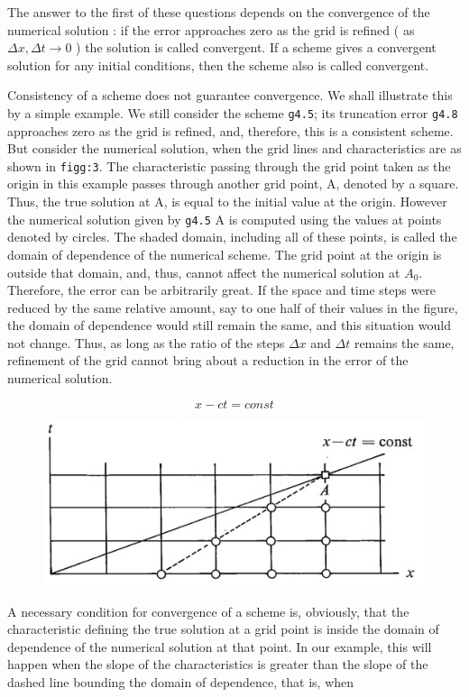 The answer to the first of these questions depends on the convergence of
the numerical solution : if the error approaches zero as the grid is
refined ( as \(\Delta x, \Delta t \rightarrow 0\) ) the solution is
called convergent. If a scheme gives a convergent solution for any
initial conditions, then the scheme also is called convergent.

Consistency of a scheme does not guarantee convergence. We shall
illustrate this by a simple example. We still consider the scheme
\texttt{g4.5}; its truncation error \texttt{g4.8} approaches zero as the
grid is refined, and, therefore, this is a consistent scheme. But
consider the numerical solution, when the grid lines and
characteristics are as shown in \texttt{figg:3}. The characteristic
passing through the grid point taken as the origin in this example
passes through another grid point, A, denoted by a square. Thus, the
true solution at A, is equal to the initial value at the origin. However
the numerical solution given by \texttt{g4.5} A is computed using the
values at points denoted by circles. The shaded domain, including all of
these points, is called the domain of dependence of the numerical
scheme. The grid point at the origin is outside that domain, and, thus,
cannot affect the numerical solution at \(A_0\). Therefore, the error
can be arbitrarily great. If the space and time steps were reduced by
the same relative amount, say to one half of their values in the figure,
the domain of dependence would still remain the same, and this situation
would not change. Thus, as long as the ratio of the steps \(\Delta x\)
and \(\Delta t\) remains the same, refinement of the grid cannot bring
about a reduction in the error of the numerical solution.

\[x - ct = const\]

\begin{figure}
    \centering
    \includegraphics[width = .7 \textwidth]{figs/NM/pic3.jpg}
    \caption{} \label{fig:}
\end{figure}

A necessary condition for convergence of a scheme is, obviously, that
the characteristic defining the true solution at a grid point is inside
the domain of dependence of the numerical solution at that point. In our
example, this will happen when the slope of the characteristics is
greater than the slope of the dashed line bounding the domain of
dependence, that is, when


